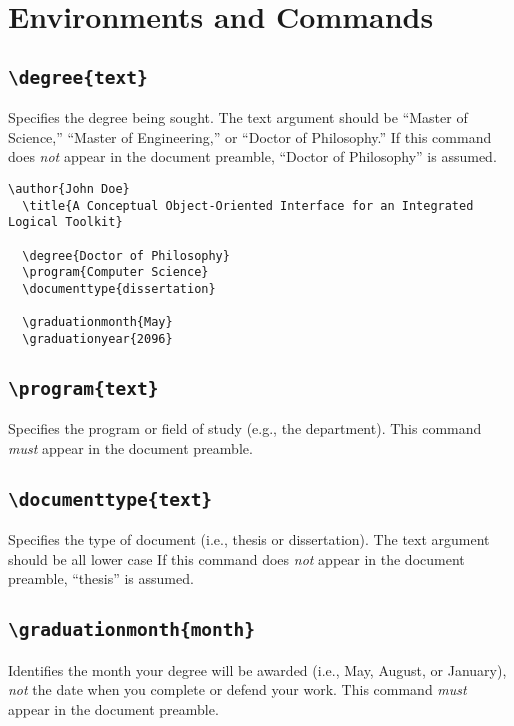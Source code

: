 \documentclass[10pt]{article}
\newcommand{\command}[1]{\texttt{\textbackslash#1}}
\begin{document}
\section{Environments and Commands}

\subsection{\command{degree\{text\}}}
Specifies the degree being sought.
The text argument should be ``Master of Science,'' ``Master of Engineering,'' or ``Doctor of Philosophy.''
If this command does \emph{not} appear in the document preamble, ``Doctor of Philosophy'' is assumed.

\begin{lstlisting}[gobble=2,float=h,caption={Sample document preamble showing the \command{degree}, \command{program}, \command{documenttype}, \command{graduationmonth}, and \command{graduationyear} commands.}]
  \author{John Doe}
  \title{A Conceptual Object-Oriented Interface for an Integrated Logical Toolkit}
  
  \degree{Doctor of Philosophy}
  \program{Computer Science}
  \documenttype{dissertation}
  
  \graduationmonth{May}
  \graduationyear{2096}
\end{lstlisting}

\subsection{\command{program\{text\}}}
Specifies the program or field of study (e.g., the department).
This command \emph{must} appear in the document preamble.

\subsection{\command{documenttype\{text\}}}
Specifies the type of document (i.e., thesis or dissertation).
The text argument should be all lower case
If this command does \emph{not} appear in the document preamble, ``thesis'' is assumed.

\subsection{\command{graduationmonth\{month\}}}
Identifies the month your degree will be awarded (i.e., May, August, or January), \emph{not} the date when you complete or defend your work.
This command \emph{must} appear in the document preamble.
\end{document}
